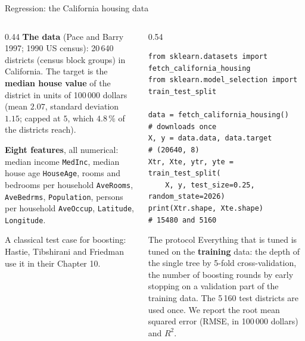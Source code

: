 \documentclass[10pt,aspectratio=169]{beamer}
\begin{document}
\begin{frame}[fragile]{Regression: the California housing data}
\begin{columns}[T]
\begin{column}{0.44\textwidth}
\footnotesize
\textbf{The data} (Pace and Barry 1997; 1990 US census): 20\,640 districts
(census block groups) in California.  The target is the \textbf{median house
value} of the district in units of 100\,000 dollars (mean $2.07$, standard
deviation $1.15$; capped at $5$, which $4.8\,\%$ of the districts reach).

\medskip
\textbf{Eight features}, all numerical: median income \texttt{MedInc},
median house age \texttt{HouseAge}, rooms and bedrooms per household
\texttt{AveRooms}, \texttt{AveBedrms}, \texttt{Population}, persons per
household \texttt{AveOccup}, \texttt{Latitude}, \texttt{Longitude}.

\medskip
A classical test case for boosting: Hastie, Tibshirani and Friedman use it
in their Chapter 10.
\end{column}
\begin{column}{0.54\textwidth}
\begin{lstlisting}
from sklearn.datasets import fetch_california_housing
from sklearn.model_selection import train_test_split

data = fetch_california_housing()    # downloads once
X, y = data.data, data.target        # (20640, 8)
Xtr, Xte, ytr, yte = train_test_split(
    X, y, test_size=0.25, random_state=2026)
print(Xtr.shape, Xte.shape)          # 15480 and 5160
\end{lstlisting}
\footnotesize
\begin{block}{The protocol}
Everything that is tuned is tuned on the \textbf{training} data: the depth
of the single tree by 5-fold cross-validation, the number of boosting
rounds by early stopping on a validation part of the training data.  The
5\,160 test districts are used once.  We report the root mean squared error
(RMSE, in 100\,000 dollars) and $R^2$.
\end{block}
\end{column}
\end{columns}
\end{frame}
\end{document}
